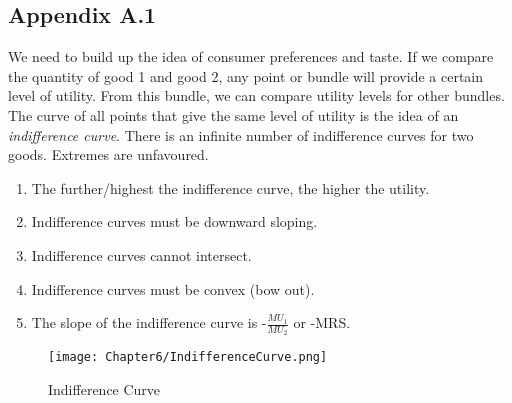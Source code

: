 \subsection*{Appendix A.1}

We need to build up the idea of consumer preferences and taste.
If we compare the quantity of good 1 and good 2, any point or bundle
will provide a certain level of utility. From this bundle, we can compare
utility levels for other bundles. The curve of all points that give the same
level of utility is the idea of an \emph{indifference curve}. There is 
an infinite number of indifference curves for two goods. Extremes are unfavoured.
\begin{enumerate}
    \item The further/highest
    the indifference curve, the higher the utility.
    \item Indifference curves must be downward 
    sloping.
    \item Indifference curves cannot intersect.
    \item Indifference curves must be convex (bow out).
    \item The slope of the indifference curve is -$\frac{MU_1}{MU_2}$ or -MRS.
\end{enumerate}
\begin{figure}[H]
    \centering
    \texttt{[image: Chapter6/IndifferenceCurve.png]}
    \caption{Indifference Curve}
    \label{fig:Indifference_Curve}
\end{figure}